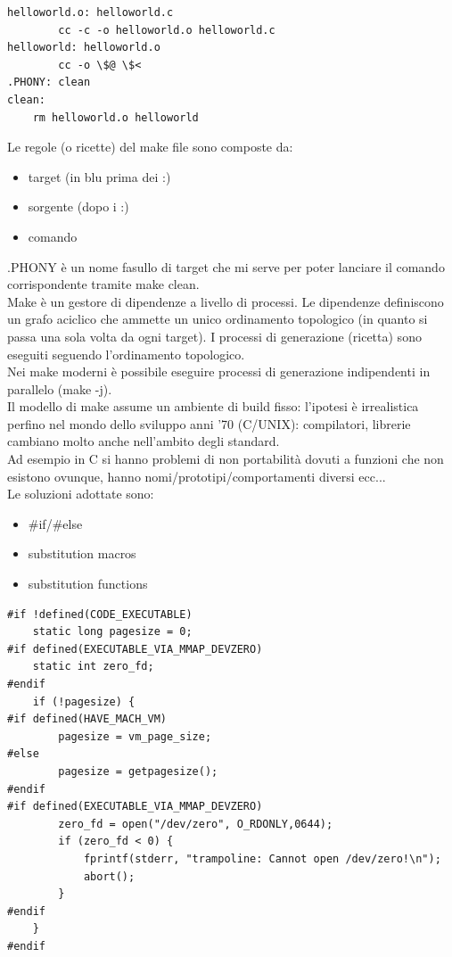 \begin{verbatim}
helloworld.o: helloworld.c
        cc -c -o helloworld.o helloworld.c 
helloworld: helloworld.o
        cc -o \$@ \$<
.PHONY: clean
clean:
    rm helloworld.o helloworld
\end{verbatim} 
Le regole (o ricette) del make file sono composte da:
\begin{itemize}
    \item target (in blu prima dei :)
    \item sorgente (dopo i :)
    \item comando 
\end{itemize}
.PHONY è un nome fasullo di target che mi serve per poter lanciare il comando corrispondente tramite make clean.\\
Make è un gestore di dipendenze a livello di processi. 
Le dipendenze definiscono un grafo aciclico che ammette un unico ordinamento topologico (in quanto si passa una sola volta da ogni target). I processi di generazione (ricetta) sono eseguiti seguendo l'ordinamento topologico.\\
Nei make moderni è possibile eseguire processi di generazione indipendenti in parallelo (make -j).\\
Il modello di make assume un ambiente di build fisso:
l’ipotesi è irrealistica perfino nel mondo dello sviluppo anni ’70 (C/UNIX): compilatori, librerie cambiano molto anche nell’ambito degli standard.\\
Ad esempio in C si hanno problemi di non portabilità dovuti a funzioni che non esistono ovunque, hanno nomi/prototipi/comportamenti diversi ecc...\\
Le soluzioni adottate sono:
\begin{itemize}
    \item \#if/\#else
    \item substitution macros
    \item substitution functions
\end{itemize}

\begin{verbatim}
#if !defined(CODE_EXECUTABLE)
    static long pagesize = 0;
#if defined(EXECUTABLE_VIA_MMAP_DEVZERO)
    static int zero_fd;
#endif
    if (!pagesize) {
#if defined(HAVE_MACH_VM)
        pagesize = vm_page_size;
#else
        pagesize = getpagesize();
#endif
#if defined(EXECUTABLE_VIA_MMAP_DEVZERO)
        zero_fd = open("/dev/zero", O_RDONLY,0644);
        if (zero_fd < 0) {
            fprintf(stderr, "trampoline: Cannot open /dev/zero!\n");
            abort();
        }
#endif
    }
#endif
\end{verbatim} 

